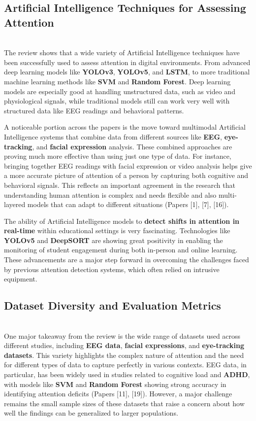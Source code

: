 \documentclass[12pt]{article}
\begin{document}
\subsection{ Artificial Intelligence Techniques for Assessing Attention} \\

The review shows that a wide variety of Artificial Intelligence techniques have been successfully used to assess attention in digital environments. From advanced deep learning models like \textbf{YOLOv3}, \textbf{YOLOv5}, and \textbf{LSTM}, to more traditional machine learning methods like \textbf{SVM} and \textbf{Random Forest}. Deep learning models are especially good at handling unstructured data, such as video and physiological signals, while traditional models still can work very well with structured data like EEG readings and behavioral patterns.

A noticeable portion across the papers is the move toward multimodal Artificial Intelligence systems that combine data from different sources like \textbf{EEG}, \textbf{eye-tracking}, and \textbf{facial expression} analysis. These combined approaches are proving much more effective than using just one type of data. For instance, bringing together EEG readings with facial expression or video analysis helps give a more accurate picture of attention of a person by capturing both cognitive and behavioral signals. This reflects an important agreement in the research that understanding human attention is complex and needs flexible and also multi-layered models that can adapt to different situations (Papers [1], [7], [16]).

The ability of Artificial Intelligence models to \textbf{detect shifts in attention in real-time} within educational settings is very fascinating. Technologies like \textbf{YOLOv5} and \textbf{DeepSORT} are showing great positivity in enabling the monitoring of student engagement during both in-person and online learning. These advancements are a major step forward in overcoming the challenges faced by previous attention detection systems, which often relied on intrusive equipment. 

\subsection{ Dataset Diversity and Evaluation Metrics} \\

One major takeaway from the review is the wide range of datasets used across different studies, including \textbf{EEG data}, \textbf{facial expressions}, and \textbf{eye-tracking datasets}. This variety highlights the complex nature of attention and the need for different types of data to capture perfectly in various contexts. EEG data, in particular, has been widely used in studies related to cognitive load and \textbf{ADHD}, with models like \textbf{SVM} and \textbf{Random Forest} showing strong accuracy in identifying attention deficits (Papers [11], [19]). However, a major challenge remains the small sample sizes of these datasets that raise a concern about how well the findings can be generalized to larger populations.
\end{document}
